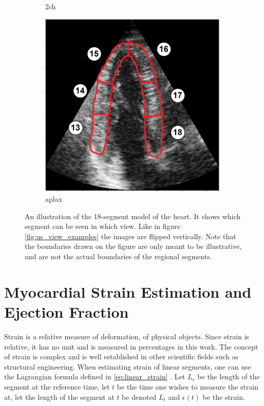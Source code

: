 \begin{figure}[H]
\begin{subfigure}[b]{0.3\textwidth}
        \caption{\acrshort{2ch}}
        \label{fig:18_segment_model_2ch}
    \end{subfigure}
    \begin{subfigure}[b]{0.3\textwidth}
        \includegraphics[width=0.99\textwidth]{echocardiography/aplax_frame_segmented.png}
        \caption{\acrshort{aplax}}
        \label{fig:18_segment_model_aplax}
    \end{subfigure}
    \caption{An illustration of the 18-segment model of the heart. It shows which segment can be seen in which view. Like in figure \ref{fig:us_view_examples} the images are flipped vertically. Note that the boundaries drawn on the figure are only meant to be illustrative, and are not the actual boundaries of the regional segments.}
    \label{fig:18_segment_model}
\end{figure}

\section{Myocardial Strain Estimation and Ejection Fraction} \label{sec:strain_est}

Strain is a relative measure of deformation, of physical objects. Since strain is relative, it has no unit and is measured in percentages in this work. The concept of strain is complex and is well established in other scientific fields such as structural engineering. When estimating strain of linear segments, one can use the Lagrangian formula defined in \eqref{eq:linear_strain} \cite{basic_concepts}. Let $L_r$ be the length of the segment at the reference time, let $t$ be the time one wishes to measure the strain at, let the length of the segment at $t$ be denoted $L_t$ and $\epsilon(t)$ be the strain. 

